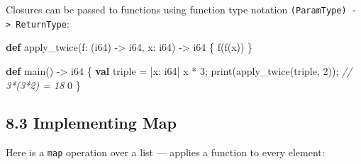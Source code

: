 \documentclass[
  english,
]{book}
\newenvironment{Shaded}{\begin{snugshade}}{\end{snugshade}}
\newcommand{\CommentTok}[1]{\textcolor[rgb]{0.42,0.60,0.33}{\textit{#1}}}
\newcommand{\DataTypeTok}[1]{\textcolor[rgb]{0.31,0.79,0.69}{#1}}
\newcommand{\DecValTok}[1]{\textcolor[rgb]{0.71,0.81,0.66}{#1}}
\newcommand{\FunctionTok}[1]{\textcolor[rgb]{0.86,0.86,0.67}{#1}}
\newcommand{\KeywordTok}[1]{\textcolor[rgb]{0.34,0.61,0.84}{\textbf{#1}}}
\newcommand{\NormalTok}[1]{\textcolor[rgb]{0.83,0.83,0.83}{#1}}
\newcommand{\OperatorTok}[1]{\textcolor[rgb]{0.83,0.83,0.83}{#1}}
\begin{document}
Closures can be passed to functions using function type notation
\texttt{(ParamType)\ -\textgreater{}\ ReturnType}:

\begin{Shaded}
\begin{Highlighting}[]
\KeywordTok{def}\NormalTok{ apply\_twice(f: (}\DataTypeTok{i64}\NormalTok{) }\OperatorTok{{-}\textgreater{}} \DataTypeTok{i64}\NormalTok{, x: }\DataTypeTok{i64}\NormalTok{) }\OperatorTok{{-}\textgreater{}} \DataTypeTok{i64}\NormalTok{ \{}
\NormalTok{    f(f(x))}
\NormalTok{\}}

\KeywordTok{def}\NormalTok{ main() }\OperatorTok{{-}\textgreater{}} \DataTypeTok{i64}\NormalTok{ \{}
    \KeywordTok{val}\NormalTok{ triple }\OperatorTok{=} \OperatorTok{|}\NormalTok{x: }\DataTypeTok{i64}\OperatorTok{|}\NormalTok{ x }\OperatorTok{*} \DecValTok{3}\NormalTok{;}
    \FunctionTok{print}\NormalTok{(apply\_twice(triple, }\DecValTok{2}\NormalTok{));   }\CommentTok{// 3*(3*2) = 18}
    \DecValTok{0}
\NormalTok{\}}
\end{Highlighting}
\end{Shaded}

\subsection{8.3 Implementing Map}\label{implementing-map}

Here is a \texttt{map} operation over a list --- applies a function to
every element:
\end{document}

